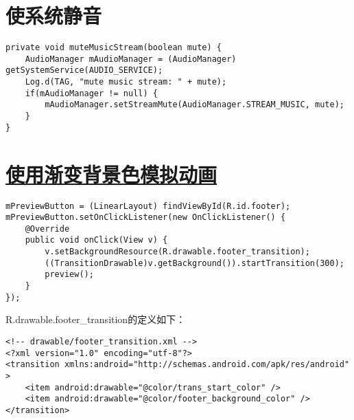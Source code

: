 ﻿\documentclass[a4paper,10pt]{article}
\begin{document}
  \section[使系统静音]{使系统静音}
  \begin{verbatim}
private void muteMusicStream(boolean mute) {
    AudioManager mAudioManager = (AudioManager) getSystemService(AUDIO_SERVICE);
    Log.d(TAG, "mute music stream: " + mute);
    if(mAudioManager != null) {
        mAudioManager.setStreamMute(AudioManager.STREAM_MUSIC, mute);
    }
}
  \end{verbatim}

  \section[使用渐变背景色模拟动画]{\underline{使用渐变背景色模拟动画}}
  \begin{verbatim}
mPreviewButton = (LinearLayout) findViewById(R.id.footer);
mPreviewButton.setOnClickListener(new OnClickListener() {
    @Override
    public void onClick(View v) {
        v.setBackgroundResource(R.drawable.footer_transition);
        ((TransitionDrawable)v.getBackground()).startTransition(300);
        preview();
    }
});
  \end{verbatim}

  R.drawable.footer\_transition的定义如下：

  \begin{verbatim}
<!-- drawable/footer_transition.xml -->
<?xml version="1.0" encoding="utf-8"?>
<transition xmlns:android="http://schemas.android.com/apk/res/android" >
    <item android:drawable="@color/trans_start_color" />
    <item android:drawable="@color/footer_background_color" />
</transition>
  \end{verbatim}

\end{document}
